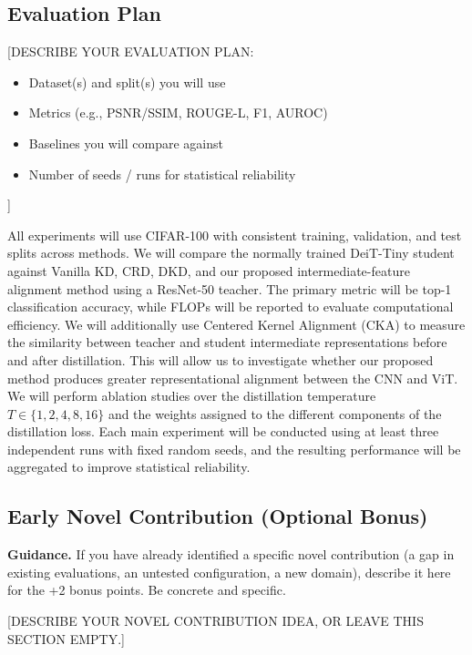 \documentclass[11pt, letterpaper]{article}
\begin{document}
\subsection{Evaluation Plan}

[DESCRIBE YOUR EVALUATION PLAN:
\begin{itemize}[noitemsep]
  \item Dataset(s) and split(s) you will use
  \item Metrics (e.g., PSNR/SSIM, ROUGE-L, F1, AUROC)
  \item Baselines you will compare against
  \item Number of seeds / runs for statistical reliability
\end{itemize}]

All experiments will use CIFAR-100 with consistent training, validation, and test splits across methods. We will compare the normally trained DeiT-Tiny student against Vanilla KD, CRD, DKD, and our proposed intermediate-feature alignment method using a ResNet-50 teacher.
The primary metric will be top-1 classification accuracy, while FLOPs will be reported to evaluate computational efficiency. We will additionally use Centered Kernel Alignment (CKA) to measure the similarity between teacher and student intermediate representations before and after distillation. This will allow us to investigate whether our proposed method produces greater representational alignment between the CNN and ViT.
We will perform ablation studies over the distillation temperature \(T \in \{1,2,4,8,16\}\) and the weights assigned to the different components of the distillation loss. Each main experiment will be conducted using at least three independent runs with fixed random seeds, and the resulting performance will be aggregated to improve statistical reliability.

\subsection{Early Novel Contribution (Optional Bonus)}

\begin{guidancebox}
\textbf{Guidance.} If you have already identified a specific novel contribution
(a gap in existing evaluations, an untested configuration, a new domain),
describe it here for the +2 bonus points. Be concrete and specific.
\end{guidancebox}

[DESCRIBE YOUR NOVEL CONTRIBUTION IDEA, OR LEAVE THIS SECTION EMPTY.]
\end{document}
